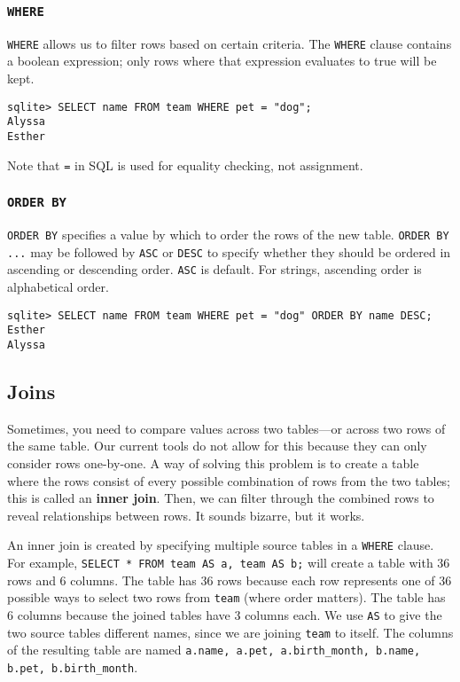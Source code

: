 \subsubsection{\lstinline{WHERE}}
\lstinline{WHERE} allows us to filter rows based on certain criteria.  The \lstinline{WHERE} clause contains a boolean expression; only rows where that expression evaluates to true will be kept.  
\begin{lstlisting}
sqlite> SELECT name FROM team WHERE pet = "dog"; 
Alyssa
Esther
\end{lstlisting}

Note that \lstinline{=} in SQL is used for equality checking, not assignment. 

\subsubsection{\lstinline{ORDER BY}}
\lstinline{ORDER BY} specifies a value by which to order the rows of the new table. \lstinline{ORDER BY ...} may be followed by \lstinline{ASC} or \lstinline{DESC} to specify whether they should be ordered in ascending or descending order. \lstinline{ASC} is default. For strings, ascending order is alphabetical order.

\begin{lstlisting}
sqlite> SELECT name FROM team WHERE pet = "dog" ORDER BY name DESC; 
Esther
Alyssa
\end{lstlisting}

\subsection{Joins}
Sometimes, you need to compare values across two tables---or across two rows of the same table. Our current tools do not allow for this because they can only consider rows one-by-one. A way of solving this problem is to create a table where the rows consist of every possible combination of rows from the two tables; this is called an \textbf{inner join}. Then, we can filter through the combined rows to reveal relationships between rows. It sounds bizarre, but it works. 

An inner join is created by specifying multiple source tables in a \lstinline{WHERE} clause. For example, \lstinline{SELECT * FROM team AS a, team AS b;} will create a table with 36 rows and 6 columns. The table has 36 rows because each row represents one of 36 possible ways to select two rows from \lstinline{team} (where order matters). The table has 6 columns because the joined tables have 3 columns each. We use \lstinline{AS} to give the two source tables different names, since we are joining \lstinline{team} to itself. The columns of the resulting table are named \lstinline{a.name, a.pet, a.birth_month, b.name, b.pet, b.birth_month}. 

